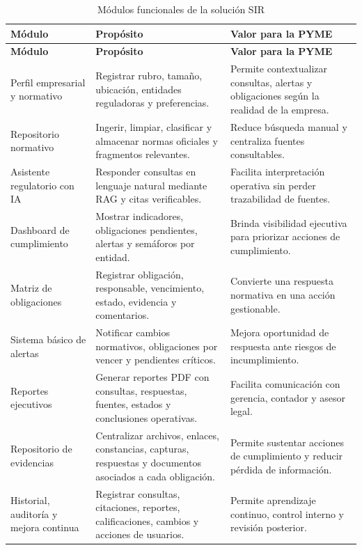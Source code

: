 \documentclass[12pt,a4paper,oneside]{report}
\begin{document}
\begin{longtable}{p{}p{}p{}}
\caption{Módulos funcionales de la solución SIR}\label{tab:cap3-modulos-sir}\\
\toprule
\textbf{Módulo} & \textbf{Propósito} & \textbf{Valor para la PYME} \\
\midrule
\endfirsthead
\toprule
\textbf{Módulo} & \textbf{Propósito} & \textbf{Valor para la PYME} \\
\midrule
\endhead
Perfil empresarial y normativo & Registrar rubro, tamaño, ubicación, entidades reguladoras y preferencias. & Permite contextualizar consultas, alertas y obligaciones según la realidad de la empresa. \\
Repositorio normativo & Ingerir, limpiar, clasificar y almacenar normas oficiales y fragmentos relevantes. & Reduce búsqueda manual y centraliza fuentes consultables. \\
Asistente regulatorio con IA & Responder consultas en lenguaje natural mediante RAG y citas verificables. & Facilita interpretación operativa sin perder trazabilidad de fuentes. \\
Dashboard de cumplimiento & Mostrar indicadores, obligaciones pendientes, alertas y semáforos por entidad. & Brinda visibilidad ejecutiva para priorizar acciones de cumplimiento. \\
Matriz de obligaciones & Registrar obligación, responsable, vencimiento, estado, evidencia y comentarios. & Convierte una respuesta normativa en una acción gestionable. \\
Sistema básico de alertas & Notificar cambios normativos, obligaciones por vencer y pendientes críticos. & Mejora oportunidad de respuesta ante riesgos de incumplimiento. \\
Reportes ejecutivos & Generar reportes PDF con consultas, respuestas, fuentes, estados y conclusiones operativas. & Facilita comunicación con gerencia, contador y asesor legal. \\
Repositorio de evidencias & Centralizar archivos, enlaces, constancias, capturas, respuestas y documentos asociados a cada obligación. & Permite sustentar acciones de cumplimiento y reducir pérdida de información. \\
Historial, auditoría y mejora continua & Registrar consultas, citaciones, reportes, calificaciones, cambios y acciones de usuarios. & Permite aprendizaje continuo, control interno y revisión posterior. \\
\bottomrule
\end{longtable}
\end{document}
